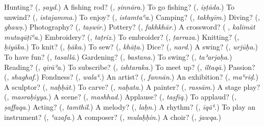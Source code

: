 \begin{tcolorbox}[breakable,colback=teal!4,colframe=teal!35!black,title={Before you move on}]
Hunting? (\textbf{}, \emph{ṣayd}.) A fishing rod? (\textbf{}, \emph{ṣinnāra}.) To go fishing? (\textbf{}, \emph{iṣṭāda}.) To unwind? (\textbf{}, \emph{istajamma}.) To enjoy? (\textbf{}, \emph{istamtaʿa}.) Camping? (\textbf{}, \emph{takhyīm}.) Diving? (\textbf{}, \emph{ghawṣ}.) Photography? (\textbf{}, \emph{taṣwīr}.) Pottery? (\textbf{}, \emph{fakhkhār}.) A crossword? (\textbf{ }, \emph{kalimāt mutaqāṭiʿa}.) Embroidery? (\textbf{}, \emph{taṭrīz}.) To embroider? (\textbf{}, \emph{ṭarraza}.) Knitting? (\textbf{}, \emph{ḥiyāka}.) To knit? (\textbf{}, \emph{ḥāka}.) To sew? (\textbf{}, \emph{khāṭa}.) Dice? (\textbf{}, \emph{nard}.) A swing? (\textbf{}, \emph{urjūḥa}.) To have fun? (\textbf{}, \emph{tasallā}.) Gardening? (\textbf{}, \emph{bastana}.) To swing? (\textbf{}, \emph{taʾarjaḥa}.) Reading? (\textbf{}, \emph{qirāʾa}.) To subscribe? (\textbf{}, \emph{ishtaraka}.) To meet up? (\textbf{}, \emph{iltaqā}.) Passion? (\textbf{}, \emph{shaghaf}.) Fondness? (\textbf{}, \emph{walaʿ}.) An artist? (\textbf{}, \emph{fannān}.) An exhibition? (\textbf{}, \emph{maʿriḍ}.) A sculptor? (\textbf{}, \emph{naḥḥāt}.) To carve? (\textbf{}, \emph{naḥata}.) A painter? (\textbf{}, \emph{rassām}.) A stage play? (\textbf{}, \emph{masraḥiyya}.) A scene? (\textbf{}, \emph{mashhad}.) Applause? (\textbf{}, \emph{taṣfīq}.) To applaud? (\textbf{}, \emph{ṣaffaqa}.) Acting? (\textbf{}, \emph{tamthīl}.) A melody? (\textbf{}, \emph{laḥn}.) A rhythm? (\textbf{}, \emph{īqāʿ}.) To play an instrument? (\textbf{}, \emph{ʿazafa}.) A composer? (\textbf{}, \emph{mulaḥḥin}.) A choir? (\textbf{}, \emph{jawqa}.)
\end{tcolorbox}
